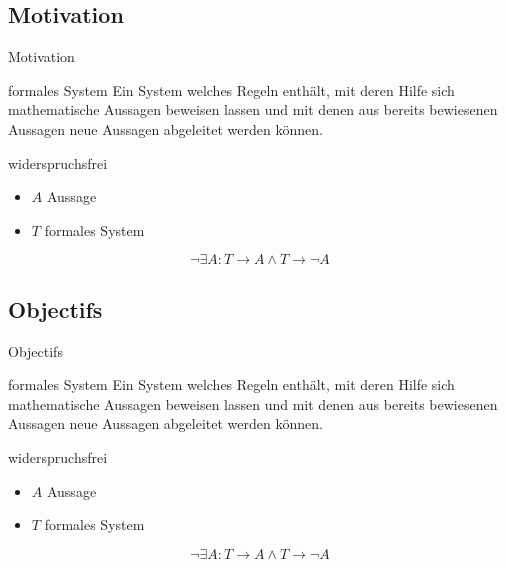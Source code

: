 \subsection{Motivation}
\begin{frame}{Motivation}
\begin{block}{formales System}
	Ein System welches Regeln enthält, mit deren Hilfe sich mathematische Aussagen beweisen lassen und mit denen aus bereits bewiesenen Aussagen neue Aussagen abgeleitet werden können.
\end{block}
\begin{block}{widerspruchsfrei}
	\begin{itemize}
		\item $A$ Aussage
		\item $T$ formales System
	\end{itemize}
	$$\neg\exists A: T\rightarrow{}A \wedge T\rightarrow{}\neg{}A $$
\end{block}
\end{frame}

\subsection{Objectifs}
\begin{frame}{Objectifs}
\begin{block}{formales System}
	Ein System welches Regeln enthält, mit deren Hilfe sich mathematische Aussagen beweisen lassen und mit denen aus bereits bewiesenen Aussagen neue Aussagen abgeleitet werden können.
\end{block}
\begin{block}{widerspruchsfrei}
	\begin{itemize}
		\item $A$ Aussage
		\item $T$ formales System
	\end{itemize}
	$$\neg\exists A: T\rightarrow{}A \wedge T\rightarrow{}\neg{}A $$
\end{block}
\end{frame}